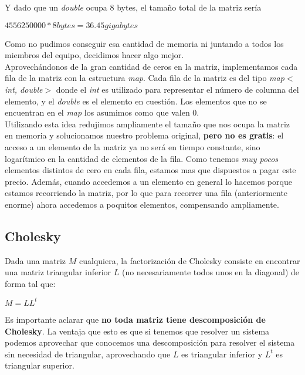 Y dado que un \textit{double} ocupa 8 bytes, el tamaño total de la matriz sería
\begin{center}
    $4 556 250 000 * 8 bytes = 36.45 gigabytes$
\end{center}

Como no pudimos conseguir esa cantidad de memoria ni juntando a todos los miembros del equipo, decidimos hacer algo mejor. \\

Aprovechándonos de la gran cantidad de ceros en la matriz, implementamos cada fila de la matriz con la estructura \textit{map}. Cada fila de la matriz es del tipo \textit{map$<$int, double$>$} donde el \textit{int} es utilizado para representar el número de columna del elemento, y el \textit{double} es el elemento en cuestión. Los elementos que no se encuentran en el \textit{map} los asumimos como que valen 0. \\

Utilizando esta idea redujimos ampliamente el tamaño que nos ocupa la matriz en memoria y solucionamos nuestro problema original, \textbf{pero no es gratis}: el acceso a un elemento de la matriz ya no será en tiempo constante, sino logarítmico en la cantidad de elementos de la fila. Como tenemos \textit{muy pocos} elementos distintos de cero en cada fila, estamos mas que dispuestos a pagar este precio. Además, cuando accedemos a un elemento en general lo hacemos porque estamos recorriendo la matriz, por lo que para recorrer una fila (anteriormente enorme) ahora accedemos a poquitos elementos, compensando ampliamente. \\

\subsection{Cholesky}

Dada una matriz $M$ cualquiera, la factorización de Cholesky consiste en encontrar una matriz triangular inferior $L$ (no necesariamente todos unos en la diagonal) de forma tal que:
\begin{center}
$M = L L^t$
\end{center}

Es importante aclarar que \textbf{no toda matriz tiene descomposición de Cholesky}.
La ventaja que esto es que si tenemos que resolver un sistema podemos aprovechar que conocemos una descomposición para resolver el sistema sin necesidad de triangular, aprovechando que $L$ es triangular inferior y $L^t$ es triangular superior.

